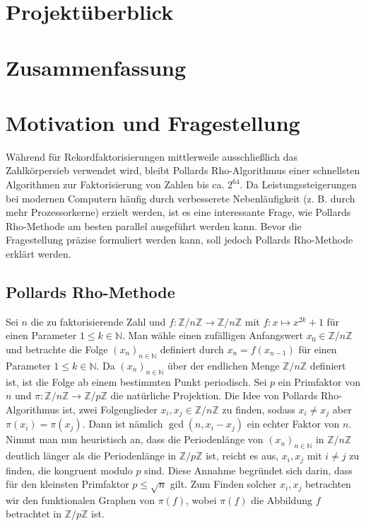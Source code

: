 \documentclass[a4paper, 10pt, ngerman]{article}
\title{\sffamily{\textbf{Parametrisierung von Pollards Rho-Methode}}}
\author{Finn Rudolph}
\date{27.01.2024}
\newcommand{\N}{\mathbb{N}}
\newcommand{\Z}{\mathbb{Z}}
\begin{document}
\maketitle

\section*{Projektüberblick}

\tableofcontents

\section{Zusammenfassung}

\section{Motivation und Fragestellung}

Während für Rekordfaktorisierungen mittlerweile ausschließlich das Zahlkörpersieb verwendet wird, bleibt Pollards Rho-Algorithmus einer schnellsten Algorithmen zur Faktorisierung von Zahlen bis ca. $2^{64}$. Da Leistungssteigerungen bei modernen Computern häufig durch verbesserete Nebenläufigkeit (z. B. durch mehr Prozessorkerne) erzielt werden, ist es eine interessante Frage, wie Pollards Rho-Methode am besten parallel ausgeführt werden kann. Bevor die Fragestellung präzise formuliert werden kann, soll jedoch Pollards Rho-Methode erklärt werden.

\subsection{Pollards Rho-Methode}

Sei $n$ die zu faktorisierende Zahl und $f : \Z/n\Z \to \Z/n\Z$ mit $f : x \mapsto x^{2k} + 1$ für einen Parameter $1 \le k \in \N$. Man wähle einen zufälligen Anfangswert $x_0 \in \Z/n\Z$ und betrachte die Folge $(x_n)_{n \in \N}$ definiert durch $x_n = f(x_{n - 1})$ für einen Parameter $1 \le k \in \N$. Da $(x_n)_{n \in \N}$ über der endlichen Menge $\Z/n\Z$ definiert ist, ist die Folge ab einem bestimmten Punkt periodisch. Sei $p$ ein Primfaktor von $n$ und $\pi : \Z/n\Z \to \Z/p\Z$ die natürliche Projektion. Die Idee von Pollards Rho-Algorithmus ist, zwei Folgenglieder $x_i, x_j \in \Z/n\Z$ zu finden, sodass $x_i \ne x_j$ aber $\pi(x_i) = \pi(x_j)$. Dann ist nämlich $\gcd(n, x_i - x_j)$ ein echter Faktor von $n$. Nimmt man nun heuristisch an, dass die Periodenlänge von $(x_n)_{n \in \N}$ in $\Z/n\Z$ deutlich länger als die Periodenlänge in $\Z/p\Z$ ist, reicht es aus, $x_i, x_j$ mit $i \ne j$ zu finden, die kongruent modulo $p$ sind. Diese Annahme begründet sich darin, dass für den kleinsten Primfaktor $p \le \sqrt n$ gilt. Zum Finden solcher $x_i, x_j$ betrachten wir den funktionalen Graphen von $\pi(f)$, wobei $\pi(f)$ die Abbildung $f$ betrachtet in $\Z/p\Z$ ist.
\end{document}
